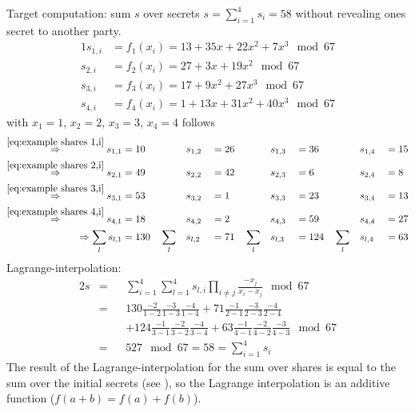 \noindent Target computation: sum $s$ over secrets $s= \sum_{i=1}^4 s_i=58$ without revealing ones secret to another party.		
\begin{alignat}{1}
s_{1,i}&=f_1(x_i)=13 + 35x + 22x^2 + 7x^3 \mod 67 \label{eq:example shares 1,i} \\
s_{2,i}&=f_2(x_i)=27 + 3x + 19x^2 \mod 67 \label{eq:example shares 2,i} \\
s_{3,i}&=f_3(x_i)=17 + 9x^2 + 27x^3 \mod 67 \label{eq:example shares 3,i} \\
s_{4,i}&=f_4(x_i)=1 + 13x + 31x^2 + 40x^3 \mod 67 \label{eq:example shares 4,i}
\end{alignat}
with $x_1=1$, $x_2=2$, $x_3=3$, $x_4=4$ follows
\begin{alignat}{7}
\overset{\ref{eq:example shares 1,i}}{\Rightarrow} s_{1,1}&=10 \quad &&s_{1,2}&&=26 \quad &&s_{1,3}&&=36 \quad  &&s_{1,4}&&=15  \nonumber \\
\overset{\ref{eq:example shares 2,i}}{\Rightarrow} s_{2,1}&=49 \quad &&s_{2,2}&&=42 \quad &&s_{2,3}&&=6 \quad &&s_{2,4}&&=8  \nonumber \\
\overset{\ref{eq:example shares 3,i}}{\Rightarrow} s_{3,1}&=53 \quad &&s_{3,2}&&=1 \quad &&s_{3,3}&&=23 \quad &&s_{3,4}&&=13  \nonumber \\
\overset{\ref{eq:example shares 4,i}}{\Rightarrow} s_{4,1}&=18 \quad &&s_{4,2}&&=2 \quad &&s_{4,3}&&=59 \quad &&s_{4,4}&&=27 \nonumber \\
\Rightarrow \sum_l s_{l,1}&=130 \quad \sum_l && s_{l,2}&&=71 \quad \sum_l && s_{l,3}&&=124 \quad \sum_l && s_{l,4}&&=63 \nonumber		
\end{alignat}
Lagrange-interpolation:
\begin{alignat}{2}
s&= &&\sum_{i=1}^{4}\sum_{l=1}^{4}s_{l,i}\prod_{i \neq j} \frac{-x_j}{x_i-x_j}\mod 67 \nonumber \\
&= &&130\frac{-2}{1-2}\frac{-3}{1-3}\frac{-4}{1-4}+71\frac{-1}{2-1}\frac{-3}{2-3}\frac{-4}{2-4} \nonumber \\
& &&+124\frac{-1}{3-1}\frac{-2}{3-2}\frac{-4}{3-4}+63\frac{-1}{4-1}\frac{-2}{4-2}\frac{-3}{4-3}\mod 67 \nonumber \\
&=&& 527 \mod 67 = 58 = \sum_{i=1}^4 s_i \label{eq:example result lagrange}
\end{alignat}
The result of the Lagrange-interpolation for the sum over shares is equal to the sum over the initial secrets (see ), so the Lagrange interpolation is an additive function ($f(a+b)=f(a)+f(b)$).


